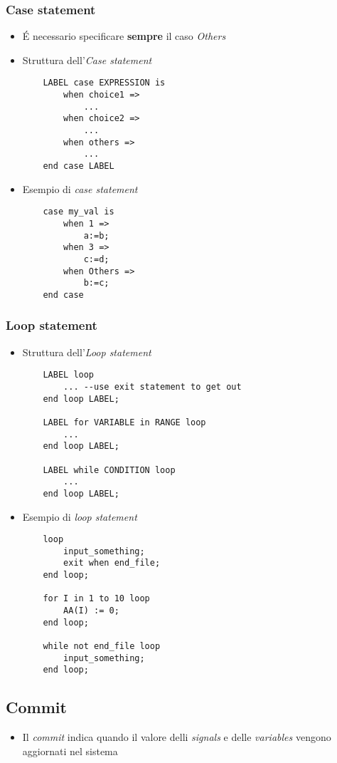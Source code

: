 \documentclass{article}
\begin{document}
\subsubsection{Case statement}
\begin{itemize}
	\item \'E necessario specificare \textbf{sempre} il caso \textit{Others}
	\item Struttura dell'\textit{Case statement}
	      \begin{verbatim}
    LABEL case EXPRESSION is
        when choice1 =>
            ...
        when choice2 =>
            ...
        when others =>
            ...
    end case LABEL
	      \end{verbatim}
	\item Esempio di \textit{case statement}
	      \begin{verbatim}
    case my_val is
        when 1 =>
            a:=b;
        when 3 =>
            c:=d;
        when Others =>
            b:=c;
    end case
	      \end{verbatim}
\end{itemize}

\newpage 

\subsubsection{Loop statement}
\begin{itemize}
	\item Struttura dell'\textit{Loop statement}
	      \begin{verbatim}
    LABEL loop
        ... --use exit statement to get out
    end loop LABEL;
    
    LABEL for VARIABLE in RANGE loop
        ...
    end loop LABEL;
    
    LABEL while CONDITION loop
        ...
    end loop LABEL;
	      \end{verbatim}
	\item Esempio di \textit{loop statement}
	      \begin{verbatim}
    loop
        input_something;
        exit when end_file;
    end loop;
    
    for I in 1 to 10 loop
        AA(I) := 0;
    end loop;
    
    while not end_file loop
        input_something;
    end loop;
	      \end{verbatim}
\end{itemize}

\subsection{Commit}
\begin{itemize}
	\item Il \textit{commit} indica quando il valore delli \textit{signals} e delle \textit{variables} vengono aggiornati nel sistema
\end{itemize}
\end{document}
